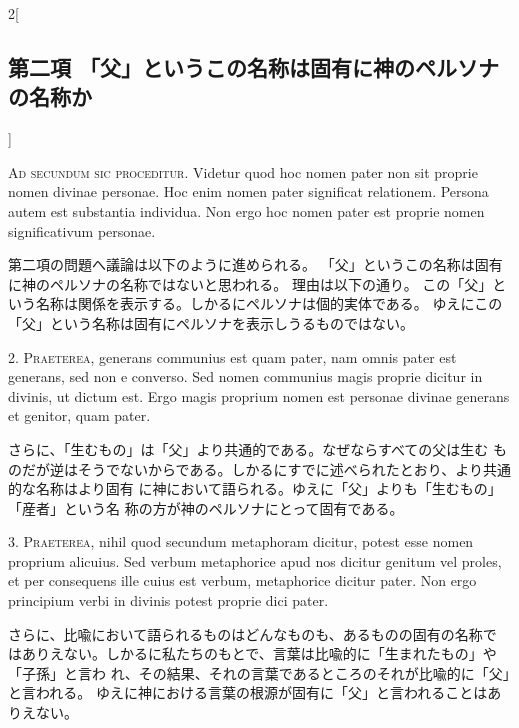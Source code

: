 \documentclass[paper=a4paper,fontsize=10pt,jafontsize=9pt,titlepage]{jlreq}
\begin{document}
\begin{paracol}{2}[\subsection{第二項 「父」というこの名称は固有に神のペルソナの名称か}]

{\scshape Ad secundum sic proceditur}. Videtur quod hoc nomen pater non sit
proprie nomen divinae personae. Hoc enim nomen pater significat
relationem. Persona autem est substantia individua. Non ergo hoc nomen
pater est proprie nomen significativum personae.


\switchcolumn


第二項の問題へ議論は以下のように進められる。
「父」というこの名称は固有に神のペルソナの名称ではないと思われる。
理由は以下の通り。
この「父」という名称は関係を表示する。しかるにペルソナは個的実体である。
 ゆえにこの「父」という名称は固有にペルソナを表示しうるものではない。




2. {\scshape Praeterea}, generans communius est quam pater, nam omnis pater est
generans, sed non e converso. Sed nomen communius magis proprie
dicitur in divinis, ut dictum est. Ergo magis proprium nomen est
personae divinae generans et genitor, quam pater.


\switchcolumn


さらに、「生むもの」は「父」より共通的である。なぜならすべての父は生む
 ものだが逆はそうでないからである。しかるにすでに述べられたとおり、より共通的な名称はより固有
 に神において語られる。ゆえに「父」よりも「生むもの」「産者」という名
 称の方が神のペルソナにとって固有である。




3. {\scshape Praeterea}, nihil quod secundum metaphoram dicitur, potest esse nomen
proprium alicuius. Sed verbum metaphorice apud nos dicitur genitum vel
proles, et per consequens ille cuius est verbum, metaphorice dicitur
pater. Non ergo principium verbi in divinis potest proprie dici pater.


\switchcolumn


さらに、比喩において語られるものはどんなものも、あるものの固有の名称で
 はありえない。しかるに私たちのもとで、言葉は比喩的に「生まれたもの」や「子孫」と言わ
 れ、その結果、それの言葉であるところのそれが比喩的に「父」と言われる。
 ゆえに神における言葉の根源が固有に「父」と言われることはありえない。



\end{paracol}
\end{document}
